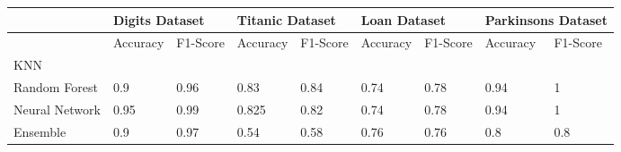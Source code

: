 \documentclass[letterpaper]{article}
\begin{document}
\begin{table}[]
	\centering
	\begin{tabular}{|l|ll|ll|ll|ll|}
		\hline
		               & \multicolumn{2}{l|}{Digits Dataset} & \multicolumn{2}{l|}{Titanic Dataset} & \multicolumn{2}{l|}{Loan Dataset} & \multicolumn{2}{l|}{Parkinsons Dataset}                                                                                       \\ \hline
		               & \multicolumn{1}{l|}{Accuracy}       & F1-Score                             & \multicolumn{1}{l|}{Accuracy}     & F1-Score                                & \multicolumn{1}{l|}{Accuracy} & F1-Score & \multicolumn{1}{l|}{Accuracy} & F1-Score \\ \hline
		KNN            & \multicolumn{1}{l|}{}               &                                      & \multicolumn{1}{l|}{}             &                                         & \multicolumn{1}{l|}{}         &          & \multicolumn{1}{l|}{}         &          \\ \hline
		Random Forest  & \multicolumn{1}{l|}{0.9}            & 0.96                                 & \multicolumn{1}{l|}{0.83}         & 0.84                                    & \multicolumn{1}{l|}{0.74}     & 0.78     & \multicolumn{1}{l|}{0.94}     & 1        \\ \hline
		Neural Network & \multicolumn{1}{l|}{0.95}           & 0.99                                 & \multicolumn{1}{l|}{0.825}        & 0.82                                    & \multicolumn{1}{l|}{0.74}     & 0.78     & \multicolumn{1}{l|}{0.94}     & 1        \\ \hline
		Ensemble       & \multicolumn{1}{l|}{0.9}            & 0.97                                 & \multicolumn{1}{l|}{0.54}         & 0.58                                    & \multicolumn{1}{l|}{0.76}     & 0.76     & \multicolumn{1}{l|}{0.8}      & 0.8      \\ \hline
	\end{tabular}
\end{table}
\end{document}
